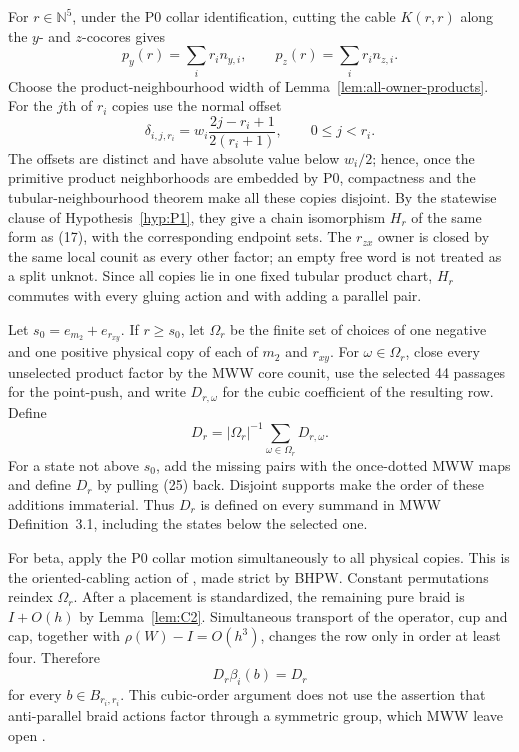 \documentclass[11pt]{amsart}
\theoremstyle{definition}
\theoremstyle{remark}
\begin{document}
For $r\in\mathbb N^5$, under the P0 collar identification, cutting the cable $K(r,r)$ along the $y$- and
$z$-cocores gives
\[
p_y(r)=\sum_i r_i n_{y,i},\qquad
p_z(r)=\sum_i r_i n_{z,i}.
\tag{24}
\]
Choose the product-neighbourhood width of
Lemma~\ref{lem:all-owner-products}.  For the $j$th of $r_i$ copies use the
normal offset
\[
\delta_{i,j,r_i}=w_i\frac{2j-r_i+1}{2(r_i+1)},\qquad 0\le j<r_i.
\]
The offsets are distinct and have absolute value below $w_i/2$; hence, once
the primitive product neighborhoods are embedded by P0, compactness and the
tubular-neighbourhood theorem make all these copies disjoint.  By the
statewise clause of Hypothesis~\ref{hyp:P1}, they give a chain isomorphism $H_r$ of the
same form as (17), with the corresponding endpoint sets.  The $r_{zx}$
owner is closed by the same local counit as every other factor; an empty
free word is not treated as a split unknot.  Since all
copies lie in one fixed tubular product chart, $H_r$ commutes with every
gluing action and with adding a parallel pair.

Let $s_0=e_{m_2}+e_{r_{xy}}$.  If $r\ge s_0$, let $\Omega_r$ be the finite set
of choices of one negative and one positive physical copy of each of $m_2$
and $r_{xy}$.  For $\omega\in\Omega_r$, close every unselected product factor
by the MWW core counit, use the selected 44 passages for the point-push, and
write $D_{r,\omega}$ for the cubic coefficient of the resulting row.  Define
\[
D_r=|\Omega_r|^{-1}\sum_{\omega\in\Omega_r}D_{r,\omega}.
\tag{25}
\]
For a state not above $s_0$, add the missing pairs with the once-dotted MWW
maps and define $D_r$ by pulling (25) back.  Disjoint supports make the order
of these additions immaterial.  Thus $D_r$ is defined on
every summand in
MWW Definition~3.1, including the states below the selected one.

For beta, apply the P0 collar motion simultaneously to all physical copies.
This is the oriented-cabling action of
\cite[Theorem~E]{BeliakovaPutyraWehrli2019}, made strict by BHPW.  Constant
permutations reindex $\Omega_r$.  After a placement is standardized, the
remaining pure braid is \(I+O(h)\) by Lemma~\ref{lem:C2}.  Simultaneous transport of the
operator, cup and cap, together with $\rho(W)-I=O(h^3)$, changes the row only
in order at least four.  Therefore
\[
D_r\beta_i(b)=D_r
\tag{26}
\]
for every $b\in B_{r_i,r_i}$.  This cubic-order argument does not use the
assertion that anti-parallel braid actions factor through a symmetric group,
which MWW leave open
\cite[Remark~3.3]{ManolescuWalkerWedrich2023}.
\end{document}
